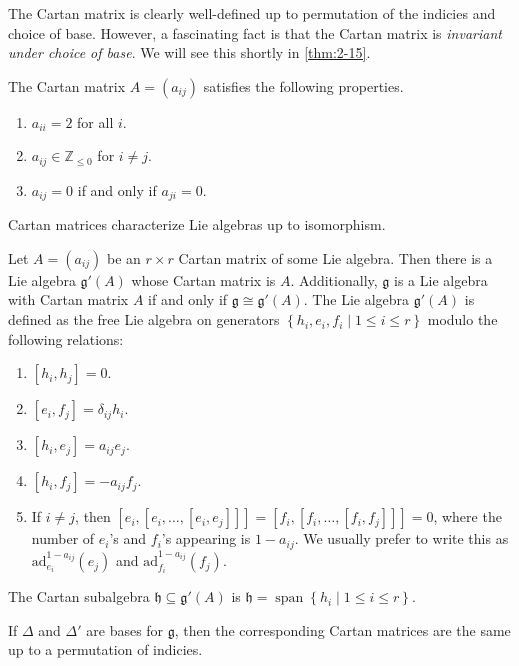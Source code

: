 \documentclass[11pt, letterpaper]{article}
\theoremstyle{plain}
\begin{document}
The Cartan matrix is clearly well-defined up to permutation of the indicies and choice of base. However, a fascinating fact is that the Cartan matrix is \emph{invariant under choice of base}. We will see this shortly in \cref{thm:2-15}.

\begin{proposition}\label{prp:2-14}
	The Cartan matrix $A=(a_{ij} )$ satisfies the following properties.
	\begin{enumerate}[label=(\arabic*), align=right]
		\item $a_{ii} =2$ for all $i$.
		\item $a_{ij} \in \mathbb{Z} _{\leq 0} $ for $i\neq j$.
		\item $a_{ij} =0$ if and only if $a_{ji} =0$.
	\end{enumerate}
\end{proposition}

Cartan matrices characterize Lie algebras up to isomorphism.

\begin{theorem}[Serre]\label{thm:2-15}
	Let $A=(a_{ij} )$ be an $r\times r$ Cartan matrix of some Lie algebra. Then there is a Lie algebra $\mathfrak{g}'(A) $ whose Cartan matrix is $A$. Additionally, $\mathfrak{g} $ is a Lie algebra with Cartan matrix $A$ if and only if $\mathfrak{g} \cong \mathfrak{g}'(A)$. The Lie algebra $\mathfrak{g} '(A)$ is defined as the free Lie algebra on generators $\left\{ h_i,e_i,f_i\mid 1\leq i\leq r \right\} $ modulo the following relations:
	\begin{enumerate}[label=(\arabic*), align=right]
		\item $[h_i,h_j]=0$.
		\item $[e_i,f_j]=\delta _{ij} h_i$.
		\item $[h_i,e_j]=a_{ij} e_j$.
		\item $[h_i,f_j]=-a_{ij} f_j$.
		\item If $i\neq j$, then $[e_i,[e_i, \ldots ,[e_i,e_j]]] = [f_i, [f_i, \ldots ,[f_i,f_j]]]=0$, where the number of $e_i$'s and $f_i$'s appearing is $1-a_{ij} $. We usually prefer to write this as $\mathrm{ad}_{e_i} ^{1-a_{ij} } (e_j)$ and $\mathrm{ad}_{f_i} ^{1-a_{ij} } (f_j)$.
	\end{enumerate}
The Cartan subalgebra $\mathfrak{h} \subseteq \mathfrak{g}'(A) $ is $\mathfrak{h} =\operatorname{span} \left\{ h_i\mid 1\leq i\leq r \right\} $. 
\end{theorem}
	

\begin{corollary}\label{cor:2-17}
	If $\Delta $ and $\Delta '$ are bases for $\mathfrak{g} $, then the corresponding Cartan matrices are the same up to a permutation of indicies.
\end{corollary}
\end{document}
